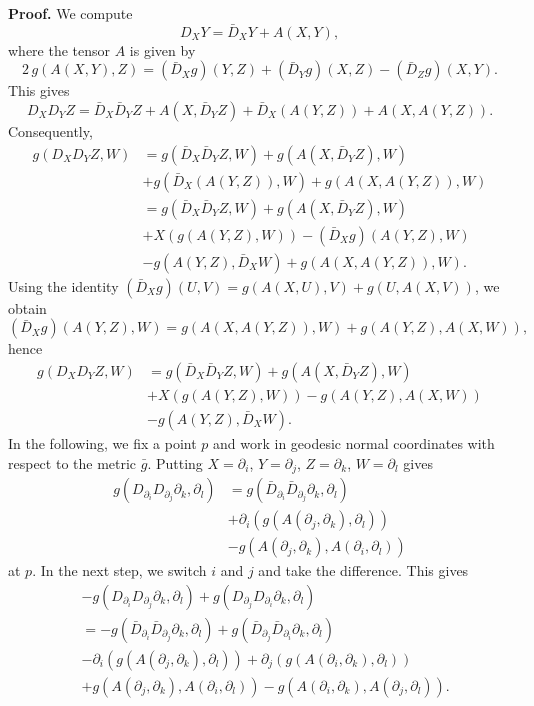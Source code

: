 \documentclass[11pt]{amsart}
\theoremstyle{definition}
\begin{document}
\textbf{Proof.} 
We compute 
\[D_X Y = \bar{D}_X Y + A(X,Y),\] 
where the tensor $A$ is given by 
\[2 \, g(A(X,Y),Z) = (\bar{D}_X g)(Y,Z) + (\bar{D}_Y g)(X,Z) - (\bar{D}_Z g)(X,Y).\]  
This gives 
\[D_X D_Y Z = \bar{D}_X \bar{D}_Y Z + A(X,\bar{D}_Y Z) + \bar{D}_X(A(Y,Z)) + A(X,A(Y,Z)).\] 
Consequently, 
\begin{align*} 
g(D_X D_Y Z,W) 
&= g(\bar{D}_X \bar{D}_Y Z,W) + g(A(X,\bar{D}_Y Z),W) \\ 
&+ g(\bar{D}_X(A(Y,Z)),W) + g(A(X,A(Y,Z)),W) \\ 
&= g(\bar{D}_X \bar{D}_Y Z,W) + g(A(X,\bar{D}_Y Z),W) \\ 
&+ X(g(A(Y,Z),W)) - (\bar{D}_X g)(A(Y,Z),W) \\ 
&- g(A(Y,Z),\bar{D}_X W) + g(A(X,A(Y,Z)),W).
\end{align*}
Using the identity $(\bar{D}_X g)(U,V) = g(A(X,U),V) + g(U,A(X,V))$, we obtain 
\[(\bar{D}_X g)(A(Y,Z),W) = g(A(X,A(Y,Z)),W) + g(A(Y,Z),A(X,W)),\] 
hence 
\begin{align*} 
g(D_X D_Y Z,W) 
&= g(\bar{D}_X \bar{D}_Y Z,W) + g(A(X,\bar{D}_Y Z),W) \\ 
&+ X(g(A(Y,Z),W)) - g(A(Y,Z),A(X,W)) \\ 
&- g(A(Y,Z),\bar{D}_X W).
\end{align*}
In the following, we fix a point $p$ and work in geodesic normal coordinates with respect to the metric $\bar{g}$. Putting $X = \partial_i$, $Y = \partial_j$, $Z = \partial_k$, $W = \partial_l$ gives 
\begin{align*} 
g(D_{\partial_i} D_{\partial_j} \partial_k,\partial_l) 
&= g(\bar{D}_{\partial_i} \bar{D}_{\partial_j} \partial_k,\partial_l) \\ 
&+ \partial_i(g(A(\partial_j,\partial_k),\partial_l)) \\ 
&- g(A(\partial_j,\partial_k),A(\partial_i,\partial_l)) 
\end{align*}
at $p$. In the next step, we switch $i$ and $j$ and take the difference. This gives 
\begin{align*} 
&-g(D_{\partial_i} D_{\partial_j} \partial_k,\partial_l) + g(D_{\partial_j} D_{\partial_i} \partial_k,\partial_l) \\ 
&= -g(\bar{D}_{\partial_i} \bar{D}_{\partial_j} \partial_k,\partial_l) + g(\bar{D}_{\partial_j} \bar{D}_{\partial_i} \partial_k,\partial_l)\\ 
&- \partial_i(g(A(\partial_j,\partial_k),\partial_l)) + \partial_j(g(A(\partial_i,\partial_k),\partial_l)) \\ 
&+ g(A(\partial_j,\partial_k),A(\partial_i,\partial_l)) - g(A(\partial_i,\partial_k),A(\partial_j,\partial_l)). 
\end{align*} 
\end{document}
